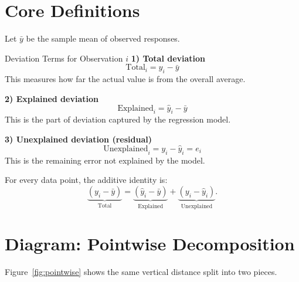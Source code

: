 \documentclass[12pt,a4paper]{article}
\begin{document}
\section{Core Definitions}

Let $\bar{y}$ be the sample mean of observed responses.

\begin{defbox}{Deviation Terms for Observation $i$}
\textbf{1) Total deviation}
\begin{equation}
\text{Total}_i = y_i - \bar{y}
\end{equation}
This measures how far the actual value is from the overall average.

\textbf{2) Explained deviation}
\begin{equation}
\text{Explained}_i = \hat{y}_i - \bar{y}
\end{equation}
This is the part of deviation captured by the regression model.

\textbf{3) Unexplained deviation (residual)}
\begin{equation}
\text{Unexplained}_i = y_i - \hat{y}_i = e_i
\end{equation}
This is the remaining error not explained by the model.
\end{defbox}

For every data point, the additive identity is:
\begin{equation}
\underbrace{(y_i-\bar{y})}_{\text{Total}} =
\underbrace{(\hat{y}_i-\bar{y})}_{\text{Explained}} +
\underbrace{(y_i-\hat{y}_i)}_{\text{Unexplained}}.
\label{eq:pointwise}
\end{equation}

\section{Diagram: Pointwise Decomposition}

Figure~\ref{fig:pointwise} shows the same vertical distance split into two pieces.
\end{document}
